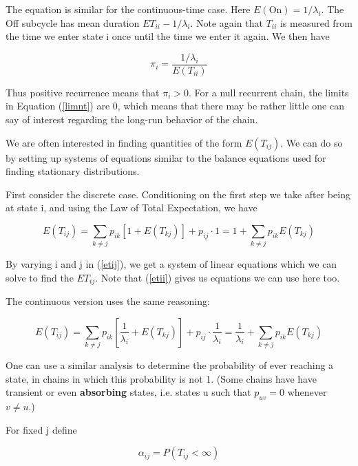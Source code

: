 The equation is similar for the continuous-time case.  Here
$E(\textrm{On}) = 1/\lambda_i$.  The Off subcycle has mean duration
$ET_{ii}-1/\lambda_i$.  Note again that $T_{ii}$ is measured from the
time we enter state i once until the time we enter it again.  We then
have

\begin{equation}
\pi_i = \frac{1/\lambda_i}{E(T_{ii})}
\end{equation}

Thus positive recurrence means that $\pi_{i}>0$. For a null recurrent
chain, the limits in Equation (\ref{limnt}) are 0, which means that
there may be rather little one can say of interest regarding the long-run
behavior of the chain.

We are often interested in finding quantities of the form $E(T_{ij})$.
We can do so by setting up systems of equations similar to the balance
equations used for finding stationary distributions.

First consider the discrete case.  Conditioning on the first step we
take after being at state i, and using the Law of Total Expectation, we
have

\begin{equation}
\label{etij}
E(T_{ij}) = \sum_{k \neq j} p_{ik} [1+E(T_{kj})] + p_{ij} \cdot 1
= 1 + \sum_{k \neq j} p_{ik} E(T_{kj})
\end{equation}

By varying i and j in (\ref{etij}), we get a system of linear equations
which we can solve to find the $ET_{ij}$.  Note that (\ref{etii}) gives
us equations we can use here too.

The continuous version uses the same reasoning:

\begin{equation}
\label{etijcontin}
E(T_{ij}) = \sum_{k \neq j} p_{ik} \left [ \frac{1}{\lambda_i}+E(T_{kj})
\right ] +  
p_{ij} \cdot \frac{1}{\lambda_i}
= \frac{1}{\lambda_i}+ \sum_{k \neq j} p_{ik} E(T_{kj})
\end{equation}


One can use a similar analysis to determine the probability of ever
reaching a state, in chains in which this probability is not 1.  (Some
chains have have transient or even {\bf absorbing} states, i.e. states u
such that $p_{uv} = 0$ whenever $v \neq u$.)

For fixed j define

\begin{equation}
\alpha_{ij} = P(T_{ij} < \infty)
\end{equation}

